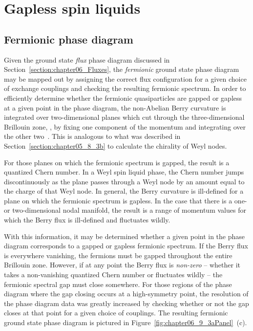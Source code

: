%
%
\section{Gapless spin liquids}
\label{section:chapter06_GaplessSpinLiquids}
%
%
\subsection{Fermionic phase diagram}
\label{section:chapter06_GaplessPhaseDiagram}
%
%
Given the ground state \textit{flux} phase diagram discussed in Section~\ref{section:chapter06_Fluxes}, the \textit{fermionic} ground state phase diagram may be mapped out by assigning the correct flux configuration for a given choice of exchange couplings and checking the resulting fermionic spectrum.
In order to efficiently determine whether the fermionic quasiparticles are gapped or gapless at a given point in the phase diagram, the non-Abelian Berry curvature is integrated over two-dimensional planes which cut through the three-dimensional Brillouin zone, \ie, by fixing one component of the momentum and integrating over the other two~\cite{FukuiJPS2005}.
This is analogous to what was described in Section~\ref{section:chapter05_8_3b} to calculate the chirality of Weyl nodes.

For those planes on which the fermionic spectrum is gapped, the result is a quantized Chern number.
In a Weyl spin liquid phase, the Chern number jumps discontinuously as the plane passes through a Weyl node by an amount equal to the charge of that Weyl node.
In general, the Berry curvature is ill-defined for a plane on which the fermionic spectrum is gapless.
In the case that there is a one- or two-dimensional nodal manifold, the result is a range of momentum values for which the Berry flux is ill-defined and fluctuates wildly.

With this information, it may be determined whether a given point in the phase diagram corresponds to a gapped or gapless fermionic spectrum.
If the Berry flux is everywhere vanishing, the fermions must be gapped throughout the entire Brillouin zone.
However, if at any point the Berry flux is \textit{non-zero} -- whether it takes a non-vanishing quantized Chern number or fluctuates wildly -- the fermionic spectral gap must close somewhere.
For those regions of the phase diagram where the gap closing occurs at a high-symmetry point, the resolution of the phase diagram data was greatly increased by checking whether or not the gap closes at that point for a given choice of couplings. 
The resulting fermionic ground state phase diagram is pictured in  Figure~\ref{fig:chapter06_9_3aPanel}~(c).

